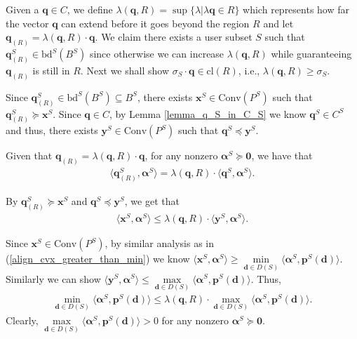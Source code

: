 \documentclass[prodmode,acmtompecs]{acmsmall}
\newcommand{\reqvec}{\mathbf{q}}
\begin{document}
Given a $\reqvec \in C$, we define $\lambda(\reqvec, R) = \sup\{ \lambda | \lambda \reqvec \in R \}$ which represents how far the vector $\reqvec$ can extend before it goes beyond the region $R$ and let $\reqvec_{(R)} = \lambda(\reqvec, R) \cdot \reqvec$. We claim there exists a user subset $S$ such that $\reqvec_{(R)}^{S} \in \text{bd}^{S}(B^{S})$ since otherwise we can increase $\lambda(\reqvec, R)$ while guaranteeing $\reqvec_{(R)}$ is still in $R$. 
Next we shall show $\sigma_S \cdot \reqvec \in \text{cl}(R)$, i.e., $\lambda(\reqvec, R) \geq \sigma_S$. 

Since $\reqvec_{(R)}^{S} \in \text{bd}^{S}(B^{S}) \subseteq B^{S}$, there exists $\mathbf{x}^{S} \in \text{Conv}(P^{S})$ such that $\reqvec_{(R)}^{S} \succeq \mathbf{x}^{S}$. Since $\reqvec \in C$, by Lemma \ref{lemma_q_S_in_C_S} we know $\reqvec^{S} \in C^{S}$ and thus, there exists $\mathbf{y}^{S} \in \text{Conv}(P^{S})$ such that $\reqvec^{S} \preceq \mathbf{y}^{S}$. 

Given that $\reqvec_{(R)} = \lambda(\reqvec, R) \cdot \reqvec$, for any nonzero $\boldsymbol{\alpha}^{S} \succeq \mathbf{0}$, we have that
\begin{align*}
\langle \reqvec_{(R)}^{S}, \boldsymbol{\alpha}^{S}  \rangle = \lambda(\reqvec, R) \cdot \langle \reqvec^{S}, \boldsymbol{\alpha}^{S}  \rangle. 
\end{align*}

By $\reqvec_{(R)}^{S} \succeq \mathbf{x}^{S}$ and $\reqvec^{S} \preceq \mathbf{y}^{S}$, we get that
\begin{align*}
\langle \mathbf{x}^{S}, \boldsymbol{\alpha}^{S}  \rangle \leq \lambda(\reqvec, R) \cdot \langle \mathbf{y}^{S}, \boldsymbol{\alpha}^{S} \rangle. 
\end{align*}

Since $\mathbf{x}^{S} \in \text{Conv}(P^{S})$, by similar analysis as in (\ref{align_cvx_greater_than_min}) we know $\langle \mathbf{x}^{S}, \boldsymbol{\alpha}^{S}  \rangle \geq \min\limits_{\mathbf{d} \in D(S)} \langle \boldsymbol{\alpha}^{S}, \mathbf{p}^{S}(\mathbf{d}) \rangle $. Similarly we can show $\langle \mathbf{y}^{S}, \boldsymbol{\alpha}^{S}  \rangle \leq \max\limits_{\mathbf{d} \in D(S)} \langle \boldsymbol{\alpha}^{S}, \mathbf{p}^{S}(\mathbf{d}) \rangle$. Thus, 
\begin{align}
\label{align_min_projection_leq_ratio_max_projection}
\min\limits_{\mathbf{d} \in D(S)} \langle \boldsymbol{\alpha}^{S}, \mathbf{p}^{S}(\mathbf{d}) \rangle \leq \lambda(\reqvec, R) \cdot \max\limits_{\mathbf{d} \in D(S)} \langle \boldsymbol{\alpha}^{S}, \mathbf{p}^{S}(\mathbf{d}) \rangle. 
\end{align}
Clearly, $\max\limits_{\mathbf{d} \in D(S)} \langle \boldsymbol{\alpha}^{S}, \mathbf{p}^{S}(\mathbf{d}) \rangle > 0$ for any nonzero $\boldsymbol{\alpha}^{S} \succeq \mathbf{0}$. 
\end{document}
